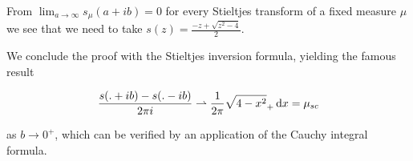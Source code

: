 From $\lim_{a\rightarrow\infty}s_\mu(a+ib)=0$ for every Stieltjes transform of a fixed measure $\mu$ we see that we need to take $s(z)=\frac{-z+\sqrt{z^2-4}}{2}$.

We conclude the proof with the Stieltjes inversion formula, yielding the famous result

$$\frac{s(.+ib)-s(.-ib)}{2\pi i}\rightharpoonup\frac{1}{2\pi}\sqrt{4-x^2}_+\mathop{}\!\mathrm{d} x=\mu_{sc}$$

as $b\rightarrow 0^+$, which can be verified by an application of the Cauchy integral formula.
















